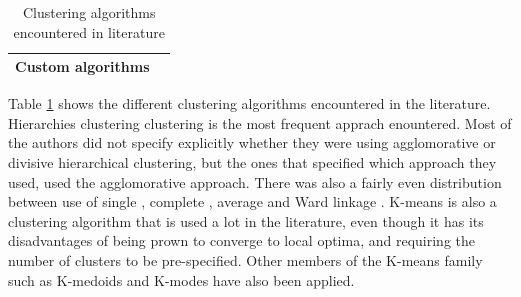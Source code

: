 \begin{table}[h]
\begin{tabular}{p{}p{}}
        Custom algorithms 				  & \cite{clust_large_datasets_aghabozorg, multivariate_tsc_common_pca, tensor_multi_elastic_kernel_tsc, var_multivar_tsc} \\
        \bottomrule
    \end{tabular}
    \caption{Clustering algorithms encountered in literature}
    \label{tab:clust_alg}
\end{table}
Table \ref{tab:clust_alg} shows the different clustering algorithms encountered in the literature. 
Hierarchies clustering clustering is the most frequent apprach enountered. 
Most of the authors did not specify explicitly whether they were using agglomorative or divisive hierarchical clustering, but the ones that specified which approach they used, used the agglomorative approach.
There was also a fairly even distribution between use of single \cite{dependency_tsc_energy_markets, copula_ica_tsc}, 
complete \cite{hier_clust_w_state_space_models, ica_tsc_sea_level, tsc_total_variation_distance, dependency_tsc_energy_markets, copula_ica_tsc, tsc_slaughterhouse}, 
average \cite{multivar_tsc_riemann_manifold, tsc_total_variation_distance, dependency_tsc_energy_markets, copula_ica_tsc} and Ward linkage \cite{shape_feat_mod_tsc_rfa, BSLEX_nonlin_nonstat_tsc, copula_ica_tsc, auto_encoder_many_tsc_algorithms}.
K-means is also a clustering algorithm that is used a lot in the literature, 
even though it has its disadvantages of being prown to converge to local optima, and requiring the number of clusters to be pre-specified.
Other members of the K-means family such as K-medoids \cite{multivariate_tsc_hmm, temporal_tsc_threshold_ar_models}
and K-modes \cite{apxdist_sax_k_modes} have also been applied. 
